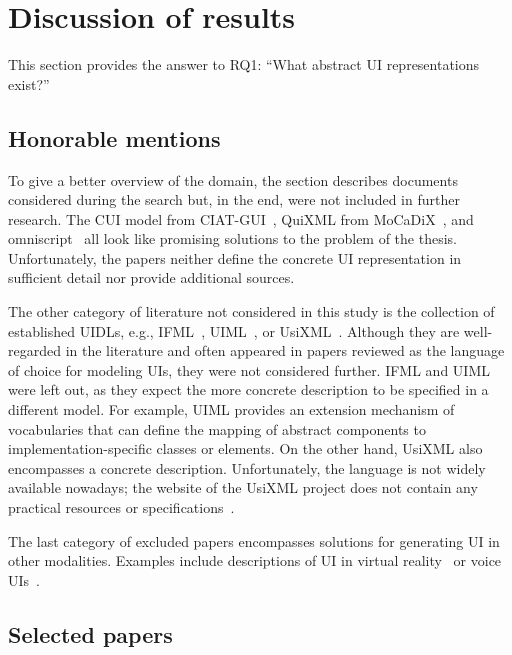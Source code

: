 \section{Discussion of results}\label{sec:review-discussion-of-results}

This section provides the answer to RQ1: \enquote{What abstract UI representations exist?}

\subsection{Honorable mentions}\label{subsec:honorable-mentions}
To give a better overview of the domain, the section describes documents considered during the search but, in the end, were not included in further research.
The CUI model from CIAT-GUI~\cite{Molina2012-my}, QuiXML from MoCaDiX~\cite{Vanderdonckt2019-av}, and omniscript~\cite{Ulusoy2019-jh} all look like promising solutions to the problem of the thesis.
Unfortunately, the papers neither define the concrete UI representation in sufficient detail nor provide additional sources.

The other category of literature not considered in this study is the collection of established UIDLs, e.g., IFML~\cite{Brambilla2014-ln}, UIML~\cite{Abrams1999}, or UsiXML~\cite{Limbourg2005}.
Although they are well-regarded in the literature and often appeared in papers reviewed as the language of choice for modeling UIs, they were not considered further.
IFML and UIML were left out, as they expect the more concrete description to be specified in a different model.
For example, UIML provides an extension mechanism of vocabularies that can define the mapping of abstract components to implementation-specific classes or elements.
On the other hand, UsiXML also encompasses a concrete description.
Unfortunately, the language is not widely available nowadays;
the website of the UsiXML project does not contain any practical resources or specifications~.

The last category of excluded papers encompasses solutions for generating UI in other modalities.
Examples include descriptions of UI in virtual reality~\cite{Olmedo2015} or voice UIs~\cite{steinberger2020domain}.

\subsection{Selected papers}\label{subsec:selected-papers}

